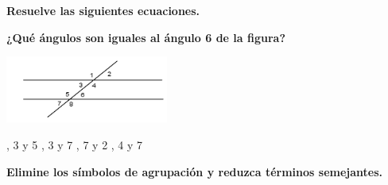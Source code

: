 \documentclass[11pt, addpoints, answers]{exam}
\begin{document}


	
	\vspace{0.5cm}
	
	\begin{questions}
		
		\question[1] \textbf{Resuelve las siguientes ecuaciones.} 
		
		
		\question[1] \textbf{¿Qué ángulos son iguales al ángulo 6 de la figura?}
		\begin{center}
			\includegraphics[width=0.4\textwidth]{image_243168.png}
		\end{center}
		\begin{choices}
			, 3 y 5
			, 3 y 7
			, 7 y 2
			, 4 y 7
		\end{choices}
		
		\question[1] \textbf{Elimine los símbolos de agrupación y reduzca términos semejantes.}  
		\begin{parts}

\end{parts}
\end{questions}
\end{document}
